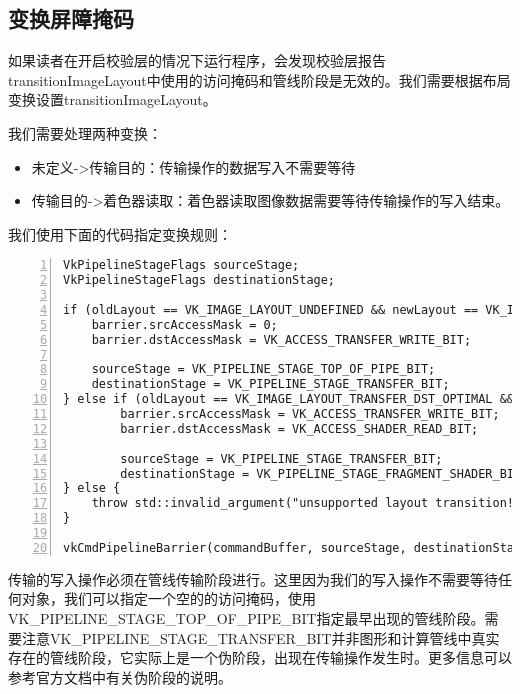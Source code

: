 \documentclass{ctexart}
\begin{document}
\subsection{变换屏障掩码}

如果读者在开启校验层的情况下运行程序，会发现校验层报告transitionImageLayout中使用的访问掩码和管线阶段是无效的。我们需要根据布局变换设置transitionImageLayout。

我们需要处理两种变换：

\begin{itemize}
	\item 未定义->传输目的：传输操作的数据写入不需要等待
	\item 传输目的->着色器读取：着色器读取图像数据需要等待传输操作的写入结束。
\end{itemize}

我们使用下面的代码指定变换规则：

\begin{lstlisting}[language={[ANSI]C},keywordstyle=\color{blue!70},commentstyle=\color{red!50!green!50!blue!50},frame=shadowbox, rulesepcolor=\color{red!20!green!20!blue!20},basicstyle=\small,numbers=left, numberstyle=\tiny,breaklines=true]
VkPipelineStageFlags sourceStage;
VkPipelineStageFlags destinationStage;

if (oldLayout == VK_IMAGE_LAYOUT_UNDEFINED && newLayout == VK_IMAGE_LAYOUT_TRANSFER_DST_OPTIMAL) {
	barrier.srcAccessMask = 0;
	barrier.dstAccessMask = VK_ACCESS_TRANSFER_WRITE_BIT;

	sourceStage = VK_PIPELINE_STAGE_TOP_OF_PIPE_BIT;
	destinationStage = VK_PIPELINE_STAGE_TRANSFER_BIT;
} else if (oldLayout == VK_IMAGE_LAYOUT_TRANSFER_DST_OPTIMAL && newLayout == VK_IMAGE_LAYOUT_SHADER_READ_ONLY_OPTIMAL) {
		barrier.srcAccessMask = VK_ACCESS_TRANSFER_WRITE_BIT;
		barrier.dstAccessMask = VK_ACCESS_SHADER_READ_BIT;

		sourceStage = VK_PIPELINE_STAGE_TRANSFER_BIT;
		destinationStage = VK_PIPELINE_STAGE_FRAGMENT_SHADER_BIT;
} else {
	throw std::invalid_argument("unsupported layout transition!");
}

vkCmdPipelineBarrier(commandBuffer, sourceStage, destinationStage, 0, 0, nullptr, 0, nullptr,1, &barrier);
\end{lstlisting}

传输的写入操作必须在管线传输阶段进行。这里因为我们的写入操作不需要等待任何对象，我们可以指定一个空的的访问掩码，使用VK\_PIPELINE\_STAGE\_TOP\_OF\_PIPE\_BIT指定最早出现的管线阶段。需要注意VK\_PIPELINE\_STAGE\_TRANSFER\_BIT并非图形和计算管线中真实存在的管线阶段，它实际上是一个伪阶段，出现在传输操作发生时。更多信息可以参考官方文档中有关伪阶段的说明。
\end{document}
